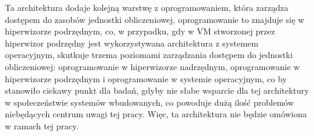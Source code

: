 \documentclass[../../main]{subfiles}
\begin{document}
Ta architektura dodaje kolejną warstwę z oprogramowaniem, która zarządza dostępem do zasobów jednostki
obliczeniowej, oprogramowanie to znajduje się w hiperwizorze podrzędnym, co, w przypadku, gdy w VM
stworzonej przez hiperwizor podrzędny jest wykorzystywana architektura z systemem operacyjnym,
skutkuje trzema poziomami zarządzania dostępem do jednostki obliczeniowej: oprogramowanie w
hiperwizorze nadrzędnym, oprogramowanie w hiperwizorze podrzędnym i oprogramowanie w systemie
operacyjnym, co by stanowiło ciekawy punkt dla badań, gdyby nie słabe wsparcie dla tej architektury w
społeczeństwie systemów wbudowanych, co powoduje dużą ilość problemów niebędących centrum uwagi tej
pracy. Więc, ta architektura nie będzie omówiona w ramach tej pracy.
\end{document}
